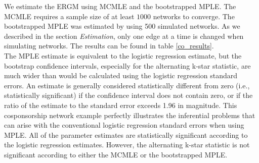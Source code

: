 \documentclass[10pt, conference, compsocconf]{IEEEtran}
\begin{document}
\indent We estimate the ERGM using MCMLE and the bootstrapped MPLE. The MCMLE requires a sample size of at least $1000$ networks to converge. The bootstrapped MPLE was estimated by using 500 simulated networks. As we described in the section {\it Estimation}, only one edge at a time is changed when simulating networks. The results can be found in table \ref{co_results}.\\
\indent The MPLE estimate is equivalent to the logistic regression estimate, but the bootstrap confidence intervals, especially for the alternating k-star statistic, are much wider than would be calculated using the logistic regression standard errors. An estimate is generally considered statistically different from zero (i.e., statistically significant) if the confidence interval does not contain zero, or if the ratio of the estimate to the standard error exceeds 1.96 in magnitude. This cosponsorship network example perfectly illustrates the inferential problems that can arise with the conventional logistic regression standard errors when using MPLE. All of the parameter estimates are statistically significant according to the logistic regression estimates. However, the alternating k-star statistic is not significant according to either the MCMLE or the bootstrapped MPLE.
\end{document}
